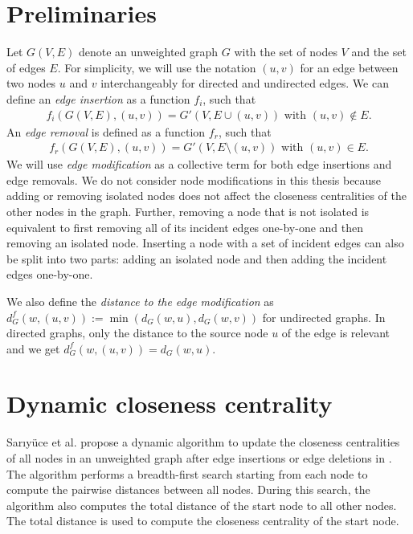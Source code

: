 \section{Preliminaries}
Let $G(V, E)$ denote an unweighted graph $G$ with the set of nodes $V$ and the set of edges $E$. For simplicity, we will use the notation $(u, v)$ for an edge between two nodes $u$ and $v$ interchangeably for directed and undirected edges. We can define an \emph{edge insertion} as a function $f_i$, such that
\begin{align}
	f_i(G(V, E), (u, v)) = G'(V, E \cup (u, v))\text{ with } (u, v) \notin E.
\end{align}
An \emph{edge removal} is defined as a function $f_r$, such that
\begin{align}
	f_r(G(V, E), (u, v)) = G'(V, E \setminus (u, v)) \text{ with } (u, v) \in E.
\end{align}
We will use \emph{edge modification} as a collective term for both edge insertions and edge removals. We do not consider node modifications in this thesis because adding or removing isolated nodes does not affect the closeness centralities of the other nodes in the graph. Further, removing a node that is not isolated is equivalent to first removing all of its incident edges one-by-one and then removing an isolated node. Inserting a node with a set of incident edges can also be split into two parts: adding an isolated node and then adding the incident edges one-by-one.

We also define the \emph{distance to the edge modification} as $d_G^f(w, (u, v)) := \min{(d_G(w, u), d_G(w, v))}$ for undirected graphs. In directed graphs, only the distance to the source node $u$ of the edge is relevant and we get $d_G^f(w, (u, v)) = d_G(w, u)$.

\section{Dynamic closeness centrality}

Sar{\i}yüce et al. propose a dynamic algorithm to update the closeness centralities of all nodes in an unweighted graph after edge insertions or edge deletions in \cite{sariyuce2013incremental}. The algorithm performs a breadth-first search starting from each node to compute the pairwise distances between all nodes. During this search, the algorithm also computes the total distance of the start node to all other nodes. The total distance is used to compute the closeness centrality of the start node. 

